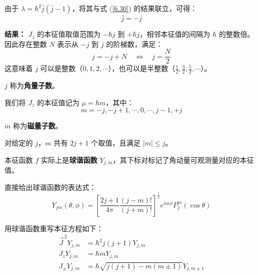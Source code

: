 由于 \(\lambda = \hbar^2 \bar{j}(\bar{j} - 1)\)，将其与式 (\ref{6.30}) 的结果联立，可得：
\begin{equation}
	\bar{j} = -j \label{6.33}
\end{equation}

\noindent\textbf{结果：} \(J_z\) 的本征值取值范围为 \(-\hbar j\) 到 \(+\hbar j\)，相邻本征值的间隔为 \(\hbar\) 的整数倍。因此存在整数 \(N\) 表示从 \(-j\) 到 \(j\) 的阶梯数，满足：
\begin{equation}
	j = -j + N \quad \Leftrightarrow \quad j = \frac{N}{2} \label{6.34}
\end{equation}
这意味着 \(j\) 可以是整数（\(0,1,2,\cdots\)），也可以是半整数（\(\frac{1}{2},\frac{3}{2},\frac{5}{2},\cdots\)）。

\(j\) 称为\textbf{角量子数}。

我们将 \(J_z\) 的本征值记为 \(\mu = \hbar m\)，其中：
\begin{equation}
	m = -j,-j+1,\cdots,0,\cdots,j-1,+j \label{6.35}
\end{equation}

$m$ 称为\textbf{磁量子数}。

对给定的 \(j\)，\(m\) 共有 \(2j+1\) 个取值，且满足 \(|m| \leq j\)。

本征函数 \(f\) 实际上是\textbf{球谐函数} \(Y_{j,m}\)，其下标对标记了角动量可观测量对应的本征值。

直接给出球谐函数的表达式：
\begin{equation}
	{Y_{jm}}(\theta ,\phi ) = {\left[ {\frac{{2j + 1}}{{4\pi }}\frac{{(j - m)!}}{{(j + m)!}}} \right]^{\frac{1}{2}}}{e^{im\phi }}P_j^m(\cos \theta )
\end{equation}

用球谐函数重写本征方程如下：
\begin{align}
	\vec{J}^{\,2} Y_{j,m} &= \hbar^2 j(j + 1) Y_{j,m} \label{6.36} \\
	J_z Y_{j,m} &= \hbar m Y_{j,m} \label{6.37} \\
	J_\pm Y_{j,m} &= \hbar \sqrt{j(j + 1) - m(m \pm 1)} Y_{j,m\pm1} \label{6.38}
\end{align}

